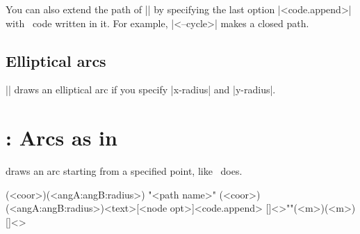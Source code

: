 You can also extend the path of |\tzarc| by specifying the last option |<code.append>| with \Tikz\ code written in it. For example, |<--cycle>| makes a closed path.


\begin{tzcode}{.3}
\end{tzcode}



\subsection{Elliptical arcs}
\label{ss:ellipticalarc}

|\tzarc| draws an elliptical arc if you specify |x-radius| and |y-radius|.

\begin{tzcode}{.3}
\end{tzcode}


\begin{tzcode}{.3}
\end{tzcode}




\section{\protect{}: Arcs as in \Tikz}
\label{s:tzarcfrom}

\icmd{\tzarcfrom} draws an arc starting from a specified point, like \Tikz\ does.

\begin{tzdef}{}
\tzarcfrom(<coor>)(<angA:angB:radius>)
"<path name>"
      (<coor>)(<angA:angB:radius>){<text>}[<node opt>]<code.append>
  []<>""(<m>)(<m>){}[]<>
\end{tzdef}


